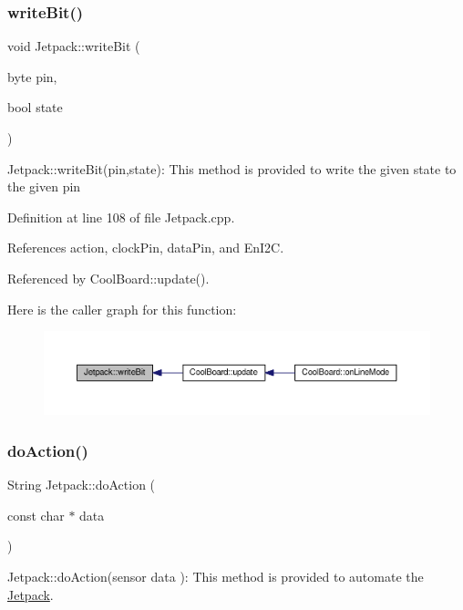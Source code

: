\subsubsection{\texorpdfstring{write\+Bit()}{writeBit()}}
{\footnotesize\ttfamily void Jetpack\+::write\+Bit (\begin{DoxyParamCaption}\item[{byte}]{pin,  }\item[{bool}]{state }\end{DoxyParamCaption})}

Jetpack\+::write\+Bit(pin,state)\+: This method is provided to write the given state to the given pin 

Definition at line 108 of file Jetpack.\+cpp.



References action, clock\+Pin, data\+Pin, and En\+I2C.



Referenced by Cool\+Board\+::update().

Here is the caller graph for this function\+:\nopagebreak
\begin{figure}[H]
\begin{center}
\leavevmode
\includegraphics[width=350pt]{df/d1d/class_jetpack_a79ae7bc3c1828a0551a7c005c4f8bd00_icgraph}
\end{center}
\end{figure}
\mbox{\label{class_jetpack_af9acedb606340c26c2636c282b54dff1}} 
\subsubsection{\texorpdfstring{do\+Action()}{doAction()}}
{\footnotesize\ttfamily String Jetpack\+::do\+Action (\begin{DoxyParamCaption}\item[{const char $\ast$}]{data }\end{DoxyParamCaption})}

Jetpack\+::do\+Action(sensor data )\+: This method is provided to automate the \hyperlink{class_jetpack}{Jetpack}.

